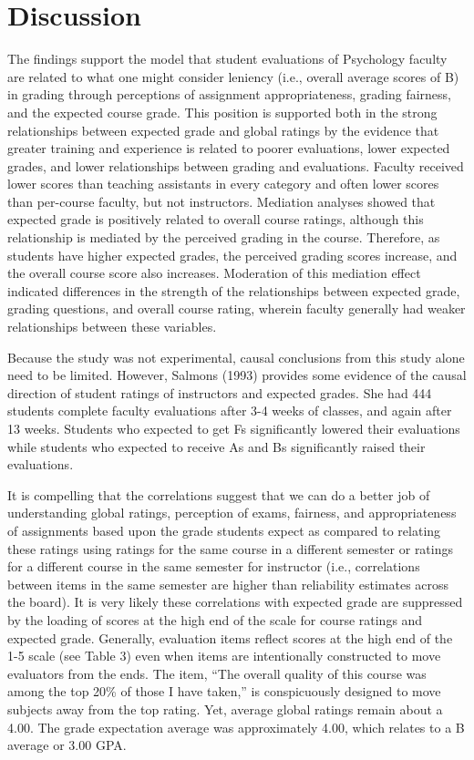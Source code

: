 \documentclass[man]{apa6}
\theoremstyle{definition}
\theoremstyle{definition}
\theoremstyle{definition}
\theoremstyle{remark}
\begin{document}
\section{Discussion}\label{discussion}

The findings support the model that student evaluations of Psychology
faculty are related to what one might consider leniency (i.e., overall
average scores of B) in grading through perceptions of assignment
appropriateness, grading fairness, and the expected course grade. This
position is supported both in the strong relationships between expected
grade and global ratings by the evidence that greater training and
experience is related to poorer evaluations, lower expected grades, and
lower relationships between grading and evaluations. Faculty received
lower scores than teaching assistants in every category and often lower
scores than per-course faculty, but not instructors. Mediation analyses
showed that expected grade is positively related to overall course
ratings, although this relationship is mediated by the perceived grading
in the course. Therefore, as students have higher expected grades, the
perceived grading scores increase, and the overall course score also
increases. Moderation of this mediation effect indicated differences in
the strength of the relationships between expected grade, grading
questions, and overall course rating, wherein faculty generally had
weaker relationships between these variables.

Because the study was not experimental, causal conclusions from this
study alone need to be limited. However, Salmons (1993) provides some
evidence of the causal direction of student ratings of instructors and
expected grades. She had 444 students complete faculty evaluations after
3-4 weeks of classes, and again after 13 weeks. Students who expected to
get Fs significantly lowered their evaluations while students who
expected to receive As and Bs significantly raised their evaluations.

It is compelling that the correlations suggest that we can do a better
job of understanding global ratings, perception of exams, fairness, and
appropriateness of assignments based upon the grade students expect as
compared to relating these ratings using ratings for the same course in
a different semester or ratings for a different course in the same
semester for instructor (i.e., correlations between items in the same
semester are higher than reliability estimates across the board). It is
very likely these correlations with expected grade are suppressed by the
loading of scores at the high end of the scale for course ratings and
expected grade. Generally, evaluation items reflect scores at the high
end of the 1-5 scale (see Table 3) even when items are intentionally
constructed to move evaluators from the ends. The item, \enquote{The
overall quality of this course was among the top 20\% of those I have
taken,} is conspicuously designed to move subjects away from the top
rating. Yet, average global ratings remain about a 4.00. The grade
expectation average was approximately 4.00, which relates to a B average
or 3.00 GPA.
\end{document}
